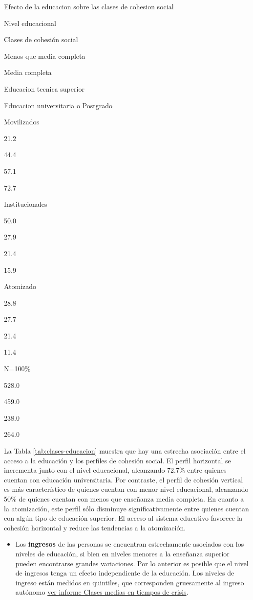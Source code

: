 \documentclass[
  12pt,
]{book}
\providecommand{\tightlist}{%
  \setlength{\itemsep}{0pt}\setlength{\parskip}{0pt}}
\begin{document}
\label{tab:clases-educacion}Efecto de la educacion sobre las clases de cohesion social

Nivel educacional

Clases de cohesión social

Menos que media completa

Media completa

Educacion tecnica superior

Educacion universitaria o Postgrado

Movilizados

21.2

44.4

57.1

72.7

Institucionales

50.0

27.9

21.4

15.9

Atomizado

28.8

27.7

21.4

11.4

N=100\%

528.0

459.0

238.0

264.0

La Tabla \ref{tab:clases-educacion} muestra que hay una estrecha asociación entre el acceso a la educación y los perfiles de cohesión social. El perfil horizontal se incrementa junto con el nivel educacional, alcanzando 72.7\% entre quienes cuentan con educación universitaria. Por contraste, el perfil de cohesión vertical es más característico de quienes cuentan con menor nivel educacional, alcanzando 50\% de quienes cuentan con menos que enseñanza media completa. En cuanto a la atomización, este perfil sólo disminuye significativamente entre quienes cuentan con algún tipo de educación superior. El acceso al sistema educativo favorece la cohesión horizontal y reduce las tendencias a la atomización.

\begin{itemize}
\tightlist
\item
  Los \textbf{ingresos} de las personas se encuentran estrechamente asociados con los niveles de educación, si bien en niveles menores a la enseñanza superior pueden encontrarse grandes variaciones. Por lo anterior es posible que el nivel de ingresos tenga un efecto independiente de la educación. Los niveles de ingreso están medidos en quintiles, que corresponden gruesamente al ingreso autónomo \href{https://drive.google.com/file/d/12PsOPviSGwowOsxzvZn_vhwEoMbyMkl3/view}{ver informe Clases medias en tiempos de crisis}.
\end{itemize}
\end{document}
